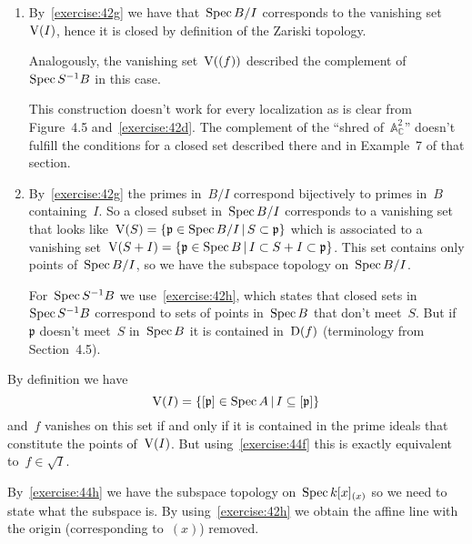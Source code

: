 \begin{exercise} %
  \label{exercise:44h}
  \begin{enumerate}
    \item By~\autoref{exercise:42g} we have that~$\operatorname{Spec} B/I$ corresponds to the vanishing set~$\operatorname{V}(I)$, hence it is closed by definition of the Zariski topology.

      Analogously, the vanishing set~$\operatorname{V}((f))$ described the complement of~$\operatorname{Spec} S^{-1}B$ in this case.

      This construction doesn't work for every localization as is clear from Figure~4.5 and~\autoref{exercise:42d}. The complement of the ``shred of~$\mathbb{A}_{\mathbb{C}}^2$'' doesn't fulfill the conditions for a closed set described there and in Example~7 of that section.

    \item By~\autoref{exercise:42g} the primes in~$B/I$ correspond bijectively to primes in~$B$ containing~$I$. So a closed subset in~$\operatorname{Spec} B/I$ corresponds to a vanishing set that looks like~$\operatorname{V}(S)=\left\{ \mathfrak{p}\in\operatorname{Spec} B/I\,|\,S\subset\mathfrak{p} \right\}$ which is associated to a vanishing set~$\operatorname{V}(S+I)=\left\{ \mathfrak{p}\in\operatorname{Spec} B\,|\,I\subset S+I\subset\mathfrak{p} \right\}$. This set contains only points of~$\operatorname{Spec} B/I$, so we have the subspace topology on~$\operatorname{Spec} B/I$.

      For~$\operatorname{Spec} S^{-1}B$ we use~\autoref{exercise:42h}, which states that closed sets in~$\operatorname{Spec} S^{-1}B$ correspond to sets of points in~$\operatorname{Spec} B$ that don't meet~$S$. But if~$\mathfrak{p}$ doesn't meet~$S$ in~$\operatorname{Spec} B$ it is contained in~$\operatorname{D}(f)$ (terminology from Section~4.5).
  \end{enumerate}
\end{exercise}

\begin{exercise}
  \label{exercise:44i}
  By definition we have
  \begin{equation}
    \operatorname{V}(I)=\left\{ [\mathfrak{p}]\in\operatorname{Spec} A\,|\,I\subseteq[\mathfrak{p}] \right\}
  \end{equation}
  and~$f$ vanishes on this set if and only if it is contained in the prime ideals that constitute the points of~$\operatorname{V}(I)$. But using~\autoref{exercise:44f} this is exactly equivalent to~$f\in\sqrt{I}$.
\end{exercise}

\begin{exercise}
  By~\autoref{exercise:44h} we have the subspace topology on~$\operatorname{Spec} k[x]_{(x)}$ so we need to state what the subspace is. By using~\autoref{exercise:42h} we obtain the affine line with the origin (corresponding to~$(x)$) removed.
\end{exercise}


